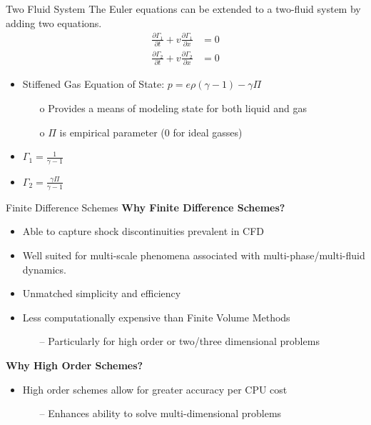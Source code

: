 \documentclass[9pt]{beamer}
\begin{document}
\begin{frame}{Two Fluid System}
  The Euler equations can be extended to a two-fluid system by adding two equations.
  \begin{align}
    \frac{\partial \Gamma_1 }{\partial t} + v\frac{\partial \Gamma_1}{\partial x}&=0\label{eq: Order Parameter One}\\
    \frac{\partial \Gamma_2 }{\partial t} + v\frac{\partial \Gamma_2}{\partial x}&=0\label{eq: Order Parameter Two}
  \end{align}

  \begin{itemize}
    \item Stiffened Gas Equation of State: $p = e\rho(\gamma - 1) -\gamma \Pi$
    \begin{itemize}
      \item[o] Provides a means of modeling state for both liquid and gas 
      \item[o] $\Pi$ is empirical parameter (0 for ideal gasses)  
    \end{itemize}
    \item $\Gamma_1 = \frac{1}{\gamma -1}$
    \item $\Gamma_2 = \frac{\gamma \Pi}{\gamma -1}$
  \end{itemize}

\end{frame}


\begin{frame}{Finite Difference Schemes}
\textbf{Why Finite Difference Schemes?}
\begin{itemize}
\item Able to capture shock discontinuities prevalent in CFD
\item Well suited for multi-scale phenomena associated with multi-phase/multi-fluid dynamics.
\item Unmatched simplicity and efficiency
\item Less computationally expensive than Finite Volume Methods
\begin{itemize}
\item[--] Particularly for high order or two/three dimensional problems \cite{FVFDComparison}
\end{itemize}
\end{itemize}
\textbf{Why High Order Schemes?}
\begin{itemize}
\item High order schemes allow for greater accuracy per CPU cost
\begin{itemize}
\item[--] Enhances ability to solve multi-dimensional problems
\end{itemize}
\end{itemize}

\end{frame}
\end{document}
